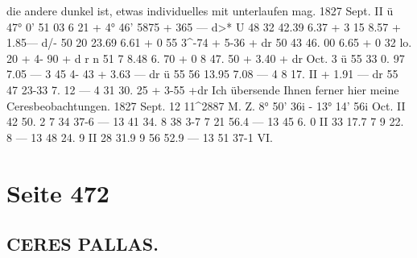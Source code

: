 \documentclass[10pt,a4paper]{article}
\begin{document}
die  andere  dunkel  ist,  etwas  individuelles  mit  unterlaufen  mag.
1827  Sept.  II
ü
47°    0'  51 \glqq{}03
6  \glqq{}21
+  4°  46'  58\glqq{}75
+  3\glqq{}65  ---  d>*
U
48    32    42.39
6.37
+  3     15      8.57
+  1.85--- d/-
50    20    23.69
6.61
+  0    55     3\textasciicircum{}-74
+  5-36  +  dr
50    43    46. 00
6.65
+  0    32     lo.  20
+  4-  90  +  d  r
n
51      7      8.48
6.  70
+  0      8    47. 50
+  3.40  +  dr
Oct.      3
ü
55     33      0. 97
7.05
---  3     45      4-  43
+  3.63  ---  dr
ü
55     56     13.95
7.08
---  4      8     17.  II
+  1.91  ---  dr
55     47    23-33
7.  12
---  4    31     30.  25
+  3-55  +dr
Ich  übersende  Ihnen  ferner  hier  meine  Ceresbeobachtungen.
1827  Sept.
12\glqq{}  11\textasciicircum{}2887  M.  Z.
8°  50'  36\glqq{}i
-  13°  14'  56\glqq{}i
Oct.
II    42    50. 2
7    34    37-6
--- 13     41     34. 8
\glqq{}     38      3-7
7    21     56.4
---  13     45      6.  0
II     33     17.7
7      9     22. 8
---  13     48    24. 9
II     28    31.9
9    56    52.9
---  13     51     37-1
VI.

\newpage
\section*{Seite 472}

\subsection*{CERES  PALLAS.}
\end{document}
